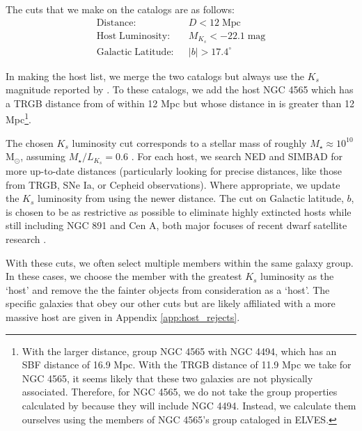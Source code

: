 \documentclass[twocolumn]{aastex62}
\newcommand{\beq}{\begin{equation}\begin{aligned}}
\newcommand{\eeq}{\end{aligned}\end{equation}}
\newcommand{\msun}{M$_\odot$}
\begin{document}
The cuts that we make on the catalogs are as follows:
\beq
    \mathrm{Distance}:& \;\; D < 12 \; \textrm{Mpc} \\ 
    \mathrm{Host\;Luminosity}:& \;\; M_{K_s} < -22.1 \; \textrm{mag} \\
    \mathrm{Galactic\;Latitude}:& \;\; |b| > 17.4^\circ
\eeq


In making the host list, we merge the two catalogs but always use the $K_s$ magnitude reported by . To these catalogs, we add the host NGC 4565 which has a TRGB distance from \citet{rs11} of within 12 Mpc but whose distance in  is greater than 12 Mpc\footnote{With the larger distance,  group NGC 4565 with NGC 4494, which has an SBF distance of 16.9 Mpc. With the TRGB distance of 11.9 Mpc we take for NGC 4565, it seems likely that these two galaxies are not physically associated. Therefore, for NGC 4565, we do not take the group properties calculated by  because they will include NGC 4494. Instead, we calculate them ourselves using the members of NGC 4565's group cataloged in ELVES.}. 

The chosen $K_s$ luminosity cut corresponds to a stellar mass of roughly $M_\star\approx 10^{10}$ \msun, assuming $M_\star/L_{K_s}=0.6$ \citep{mcgaugh2014}. For each host, we search NED and SIMBAD for more up-to-date distances (particularly looking for precise distances, like those from TRGB, SNe Ia, or Cepheid observations). Where appropriate, we update the $K_s$ luminosity from  using the newer distance. The cut on Galactic latitude, $b$, is chosen to be as restrictive as possible to eliminate highly extincted hosts while still including NGC 891 and  Cen A, both major focuses of recent dwarf satellite research \citep[e.g.][]{trentham2009, muller2019_n891, crnojevic2019, muller2021}.



With these cuts, we often select multiple members within the same galaxy group. In these cases, we choose the member with the greatest $K_s$ luminosity as the `host' and remove the the fainter objects from consideration as a `host'. The specific galaxies that obey our other cuts but are likely affiliated with a more massive host are given in Appendix \ref{app:host_rejects}. 




\end{document}
